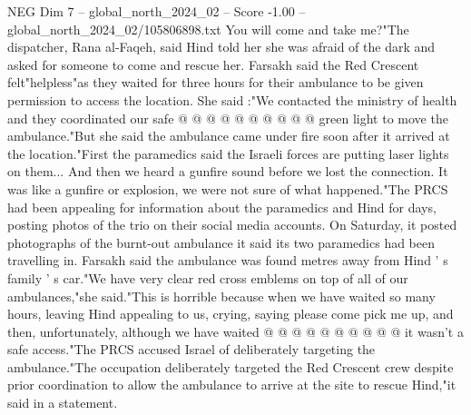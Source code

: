 \begin{textsample}{NEG Dim 7 – global\_north\_2024\_02 – Score -1.00 – global\_north\_2024\_02/105806898.txt}
You will come and take me?"The dispatcher, Rana al-Faqeh, said Hind told her she was afraid of the dark and asked for someone to come and rescue her.
Farsakh said the Red Crescent felt"helpless"as they waited for three hours for their ambulance to be given permission to access the location.
She said :"We contacted the ministry of health and they coordinated our safe @ @ @ @ @ @ @ @ @ @ green light to move the ambulance."But she said the ambulance came under fire soon after it arrived at the location."First the paramedics said the Israeli forces are putting laser lights on them...
And then we heard a gunfire sound before we lost the connection.
It was like a gunfire or explosion, we were not sure of what happened."The PRCS had been appealing for information about the paramedics and Hind for days, posting photos of the trio on their social media accounts.
On Saturday, it posted photographs of the burnt-out ambulance it said its two paramedics had been travelling in.
Farsakh said the ambulance was found metres away from Hind ' s family ' s car."We have very clear red cross emblems on top of all of our ambulances,"she said."This is horrible because when we have waited so many hours, leaving Hind appealing to us, crying, saying please come pick me up, and then, unfortunately, although we have waited @ @ @ @ @ @ @ @ @ @ it wasn't a safe access."The PRCS accused Israel of deliberately targeting the ambulance."The occupation deliberately targeted the Red Crescent crew despite prior coordination to allow the ambulance to arrive at the site to rescue Hind,"it said in a statement.

\end{textsample}
